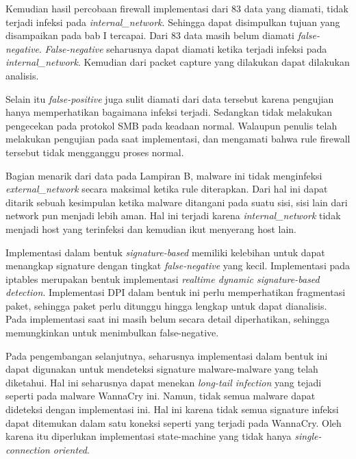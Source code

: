 Kemudian hasil percobaan firewall implementasi dari 83 data yang diamati, tidak terjadi infeksi pada \textit{internal\_network}. Sehingga dapat disimpulkan tujuan yang disampaikan pada bab I tercapai. Dari 83 data masih belum diamati \textit{false-negative}. \textit{False-negative} seharusnya dapat diamati ketika terjadi infeksi pada \textit{internal\_network}. Kemudian dari packet capture yang dilakukan dapat dilakukan analisis.

Selain itu \textit{false-positive} juga sulit diamati dari data tersebut karena pengujian hanya memperhatikan bagaimana infeksi terjadi. Sedangkan tidak melakukan pengecekan pada protokol SMB pada keadaan normal. Walaupun penulis telah melakukan pengujian pada saat implementasi, dan mengamati bahwa rule firewall tersebut tidak mengganggu proses normal.

Bagian menarik dari data pada Lampiran B, malware ini tidak menginfeksi \textit{external\_network} secara maksimal ketika rule diterapkan. Dari hal ini dapat ditarik sebuah kesimpulan ketika malware ditangani pada suatu sisi, sisi lain dari network pun menjadi lebih aman. Hal ini terjadi karena \textit{internal\_network} tidak menjadi host yang terinfeksi dan kemudian ikut menyerang host lain.

Implementasi dalam bentuk \textit{signature-based} memiliki kelebihan untuk dapat menangkap signature dengan tingkat \textit{false-negative} yang kecil. Implementasi pada iptables merupakan bentuk implementasi \textit{realtime dynamic signature-based detection}. Implementasi DPI dalam bentuk ini perlu memperhatikan fragmentasi paket, sehingga paket perlu ditunggu hingga lengkap untuk dapat dianalisis. Pada implementasi saat ini masih belum secara detail diperhatikan, sehingga memungkinkan untuk menimbulkan false-negative.

Pada pengembangan selanjutnya, seharusnya implementasi dalam bentuk ini dapat digunakan untuk mendeteksi signature malware-malware yang telah diketahui. Hal ini seharusnya dapat menekan \textit{long-tail infection} yang tejadi seperti pada malware WannaCry ini. Namun, tidak semua malware dapat dideteksi dengan implementasi ini. Hal ini karena tidak semua signature infeksi dapat ditemukan dalam satu koneksi seperti yang terjadi pada WannaCry. Oleh karena itu diperlukan implementasi state-machine yang tidak hanya \textit{single-connection oriented}.